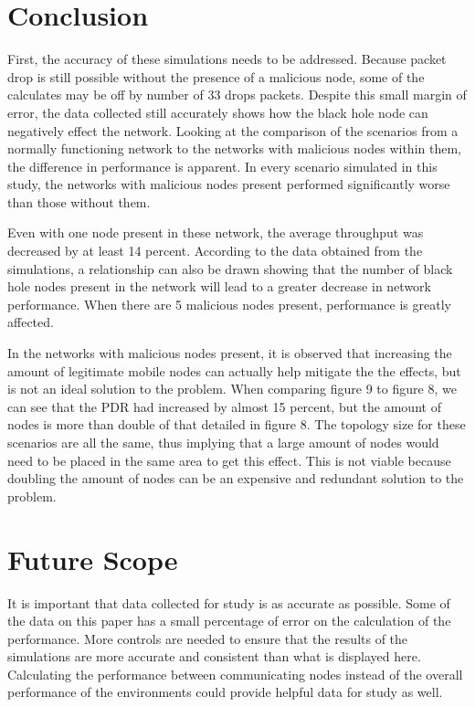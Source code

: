 \documentclass[conference,12pt]{IEEEtran}
\begin{document}
\section{Conclusion}
First, the accuracy of these simulations needs to be addressed. Because packet drop is still possible without the presence of a malicious node, some of the calculates may be off by number of 33 drops packets. Despite this small margin of error, the data collected still accurately shows how the black hole node can negatively effect the network. Looking at the comparison of the scenarios from a normally functioning network to the networks with malicious nodes within them, the difference in performance is apparent. In every scenario simulated in this study, the networks with malicious nodes present performed significantly worse than those without them. 

Even with one node present in these network, the average throughput was decreased by at least 14 percent. According to the data obtained from the simulations, a relationship can also be drawn showing that the number of black hole nodes present in the network will lead to a greater decrease in network performance. When there are 5 malicious nodes present, performance is greatly affected. 

In the networks with malicious nodes present, it is observed that increasing the amount of legitimate mobile nodes can actually help mitigate the the effects, but is not an ideal solution to the problem. When comparing figure 9 to figure 8, we can see that the PDR had increased by almost 15 percent, but the amount of nodes is more than double of that detailed in figure 8. The topology size for these scenarios are all the same, thus implying that a large amount of nodes would need to be placed in the same area to get this effect. This is not viable because doubling the amount of nodes can be an expensive and redundant solution to the problem. 
\section{Future Scope}
It is important that data collected for study is as accurate as possible. Some of the data on this paper has a small percentage of error on the calculation of the performance. More controls are needed to ensure that the results of the simulations are more accurate and consistent than what is displayed here. Calculating the performance between communicating nodes instead of the overall performance of the environments could provide helpful data for study as well.
\end{document}
